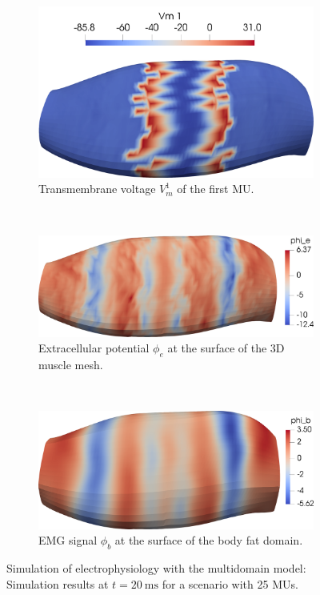 \begin{figure}
  \centering%
  \begin{subfigure}[t]{\textwidth}%
    \centering%
    \includegraphics[width=11cm]{images/results/application/multidomain_25mus_snapshot.png}%
    \caption{Transmembrane voltage $V_m^1$ of the first MU.}%
    \label{fig:multidomain_25mus_snapshot}%
  \end{subfigure} \\[4mm]
  \begin{subfigure}[t]{\textwidth}%
    \centering%
    \includegraphics[width=12cm]{images/results/application/multidomain_25mus2_emg.png}%
    \caption{Extracellular potential $\phi_e$ at the surface of the 3D muscle mesh.}%
    \label{fig:multidomain_25mus2_emg}%
  \end{subfigure} \\[4mm]
  \begin{subfigure}[t]{\textwidth}%
    \centering%
    \includegraphics[width=12cm]{images/results/application/multidomain_25mus2_body.png}%
    \caption{EMG signal $\phi_b$ at the surface of the body fat domain.}%
    \label{fig:multidomain_25mus2_body}%
  \end{subfigure}
  \caption{Simulation of electrophysiology with the multidomain model: Simulation results at $t=\SI{20}{\ms}$ for a scenario with 25 MUs.}%
  \label{fig:multidomain_25mus2}%
\end{figure}%



